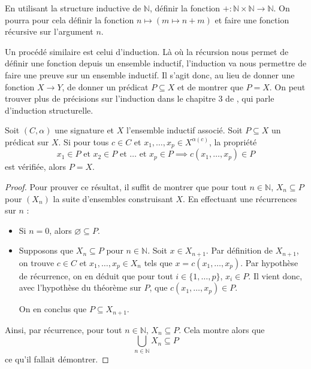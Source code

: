 \begin{exercise}
  En utilisant la structure inductive de $\mathbb N$, définir la fonction
  $+ : \mathbb N \times \mathbb N \to \mathbb N$. On pourra pour cela définir
  la fonction $n \mapsto (m \mapsto n + m)$ et faire une fonction récursive sur
  l'argument $n$.
\end{exercise}

Un procédé similaire est celui d'induction. Là où la récursion nous permet de
définir une fonction depuis un ensemble inductif, l'induction va nous permettre
de faire une preuve sur un ensemble inductif. Il s'agit donc, au lieu de donner
une fonction $X \to Y$, de donner un prédicat $P \subseteq X$ et de montrer que
$P = X$. On peut trouver plus de précisions sur l'induction dans le chapitre $3$
de \cite{winskell1996formal}, qui parle d'induction structurelle.

\begin{theorem}
  Soit $(C,\alpha)$ une signature et $X$ l'ensemble inductif associé. Soit
  $P\subseteq X$ un prédicat sur $X$. Si pour tous $c\in C$ et
  $x_1,\ldots,x_p\in X^{\alpha(c)}$, la propriété
  \[x_1\in P \text{ et } x_2\in P \text{ et }\ldots \text{ et }x_p\in P \implies
  c(x_1,\ldots,x_p)\in P\] est vérifiée,
  alors $P = X$.
\end{theorem}

\begin{proof}
  Pour prouver ce résultat, il suffit de montrer que pour tout $n\in\mathbb N$,
  $X_n \subseteq P$ pour $(X_n)$ la suite d'ensembles construisant $X$. En
  effectuant une récurrences sur $n$ :
  \begin{itemize}
  \item Si $n = 0$, alors $\varnothing \subseteq P$.
  \item Supposons que $X_n \subseteq P$ pour $n \in \mathbb N$. Soit
    $x \in X_{n+1}$. Par définition de $X_{n+1}$, on trouve $c \in C$ et
    $x_1,\ldots,x_p \in X_n$ tels que $x = c(x_1,\ldots,x_p)$. Par hypothèse
    de récurrence, on en déduit que pour tout $i\in\{1,\ldots,p\}$, $x_i\in P$.
    Il vient donc, avec l'hypothèse du théorème sur $P$, que
    $c(x_1,\ldots,x_p)\in P$.

    On en conclus que $P\subseteq X_{n+1}$.
  \end{itemize}

  Ainsi, par récurrence, pour tout $n\in \mathbb N$, $X_n \subseteq P$.
  Cela montre alors que
  \[\bigcup_{n \in \mathbb N} X_n \subseteq P\]
  ce qu'il fallait démontrer.
\end{proof}

